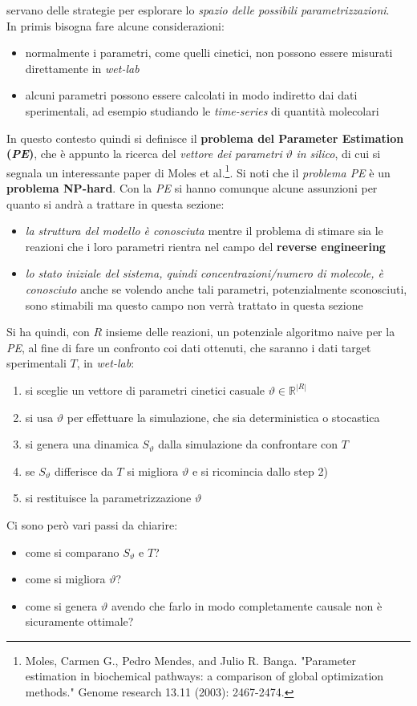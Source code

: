 \documentclass[a4paper,12pt, oneside]{book}
\begin{document}
servano delle strategie per esplorare lo \textit{spazio delle possibili
  parametrizzazioni}. \\
In primis bisogna fare alcune considerazioni:
\begin{itemize}
  \item normalmente i parametri, come quelli cinetici, non possono essere
  misurati direttamente in \textit{wet-lab}
  \item alcuni parametri possono essere calcolati in modo indiretto dai dati
  sperimentali, ad esempio studiando le \textit{time-series} di quantità
  molecolari 
\end{itemize}
In questo contesto quindi si definisce il \textbf{problema del Parameter
  Estimation (\textit{PE})}, che è appunto la ricerca del \textit{vettore dei
  parametri} $\vartheta$ \textit{in silico}, di cui si segnala un interessante
paper di Moles et al.\footnote{Moles, Carmen G., Pedro Mendes, and Julio
  R. Banga. "Parameter estimation in biochemical pathways: a comparison of
  global optimization methods." Genome research 13.11 (2003): 2467-2474.}. Si
noti che il \textit{problema PE} è un \textbf{problema NP-hard}. Con
la \textit{PE} si hanno comunque alcune assunzioni per quanto si andrà a
trattare in questa sezione:
\begin{itemize}
  \item \textit{la struttura del modello è conosciuta} mentre il problema di
  stimare sia le reazioni che i loro parametri rientra nel campo del
  \textbf{reverse engineering}
  \item \textit{lo stato iniziale del sistema, quindi concentrazioni/numero di
    molecole, è conosciuto} anche se volendo anche tali parametri,
  potenzialmente sconosciuti, sono stimabili
  ma questo campo non verrà trattato in questa sezione
\end{itemize}
Si ha quindi, con $R$ insieme delle reazioni, un potenziale algoritmo naive per
la \textit{PE}, al fine di fare 
un confronto coi dati ottenuti, che saranno i dati target sperimentali $T$, in
\textit{wet-lab}: 
\begin{enumerate}
  \item si sceglie un vettore di parametri cinetici casuale 
  $\vartheta \in\mathbb{R}^{|R|}$
  \item si usa $\vartheta$ per effettuare la simulazione, che sia deterministica
  o stocastica
  \item si genera una dinamica $S_\vartheta$ dalla simulazione da confrontare
  con $T$
  \item se $S_\vartheta$ differisce da $T$ si migliora $\vartheta$ e si
  ricomincia dallo step 2)
  \item si restituisce la parametrizzazione $\vartheta$
\end{enumerate}
Ci sono però vari passi da chiarire:
\begin{itemize}
  \item come si comparano $S_\vartheta$ e $T$?
  \item come si migliora $\vartheta$?
  \item come si genera $\vartheta$ avendo che farlo in modo completamente
  causale non è sicuramente ottimale?
\end{itemize}
\end{document}
